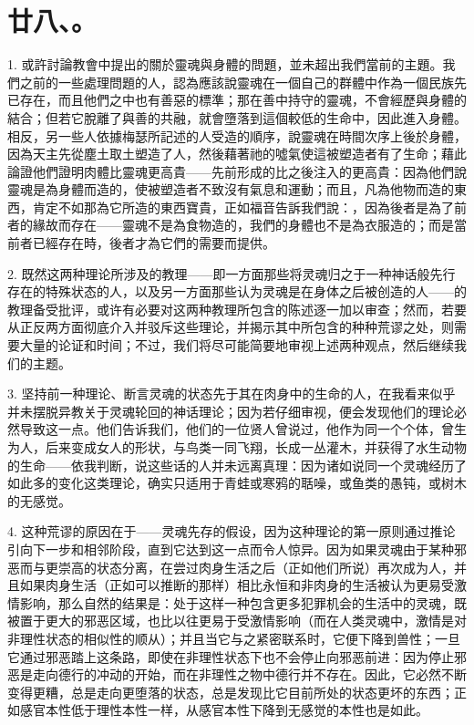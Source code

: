 
\section{廿八、。}

1. 或許討論教會中提出的關於靈魂與身體的問題，並未超出我們當前的主題。我們之前的一些處理問題的人，認為應該說靈魂在一個自己的群體中作為一個民族先已存在，而且他們之中也有善惡的標準；那在善中持守的靈魂，不會經歷與身體的結合；但若它脫離了與善的共融，就會墮落到這個較低的生命中，因此進入身體。相反，另一些人依據梅瑟所記述的人受造的順序，說靈魂在時間次序上後於身體，因為天主先從塵土取土塑造了人，然後藉著祂的噓氣使這被塑造者有了生命；藉此論證他們證明肉體比靈魂更高貴——先前形成的比之後注入的更高貴：因為他們說靈魂是為身體而造的，使被塑造者不致沒有氣息和運動；而且，凡為他物而造的東西，肯定不如那為它所造的東西寶貴，正如福音告訴我們說：，因為後者是為了前者的緣故而存在——靈魂不是為食物造的，我們的身體也不是為衣服造的；而是當前者已經存在時，後者才為它們的需要而提供。\par

2. 既然这两种理论所涉及的教理——即一方面那些将灵魂归之于一种神话般先行存在的特殊状态的人，以及另一方面那些认为灵魂是在身体之后被创造的人——的教理备受批评，或许有必要对这两种教理所包含的陈述逐一加以审查；然而，若要从正反两方面彻底介入并驳斥这些理论，并揭示其中所包含的种种荒谬之处，则需要大量的论证和时间；不过，我们将尽可能简要地审视上述两种观点，然后继续我们的主题。\par

3. 坚持前一种理论、断言灵魂的状态先于其在肉身中的生命的人，在我看来似乎并未摆脱异教关于灵魂轮回的神话理论；因为若仔细审视，便会发现他们的理论必然导致这一点。他们告诉我们，他们的一位贤人曾说过，他作为同一个个体，曾生为人，后来变成女人的形状，与鸟类一同飞翔，长成一丛灌木，并获得了水生动物的生命——依我判断，说这些话的人并未远离真理：因为诸如说同一个灵魂经历了如此多的变化这类理论，确实只适用于青蛙或寒鸦的聒噪，或鱼类的愚钝，或树木的无感觉。\par

4. 这种荒谬的原因在于——灵魂先存的假设，因为这种理论的第一原则通过推论引向下一步和相邻阶段，直到它达到这一点而令人惊异。因为如果灵魂由于某种邪恶而与更崇高的状态分离，在尝过肉身生活之后（正如他们所说）再次成为人，并且如果肉身生活（正如可以推断的那样）相比永恒和非肉身的生活被认为更易受激情影响，那么自然的结果是：处于这样一种包含更多犯罪机会的生活中的灵魂，既被置于更大的邪恶区域，也比以往更易于受激情影响（而在人类灵魂中，激情是对非理性状态的相似性的顺从）；并且当它与之紧密联系时，它便下降到兽性；一旦它通过邪恶踏上这条路，即使在非理性状态下也不会停止向邪恶前进：因为停止邪恶是走向德行的冲动的开始，而在非理性之物中德行并不存在。因此，它必然不断变得更糟，总是走向更堕落的状态，总是发现比它目前所处的状态更坏的东西；正如感官本性低于理性本性一样，从感官本性下降到无感觉的本性也是如此。\par

